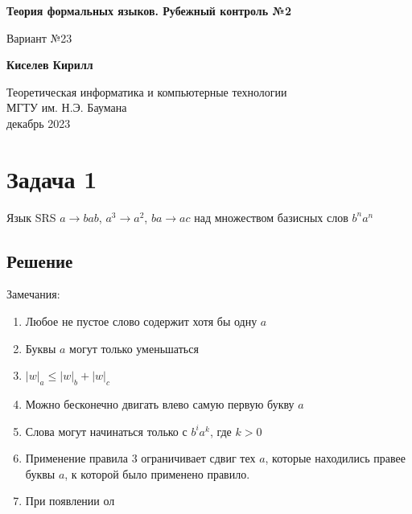 \documentclass[a4paper, 14pt]{article}
\begin{document}
\begin{titlepage}
    \begin{center}
        \vspace*{1cm}
            
        \Huge
        \textbf{Теория формальных языков. Рубежный контроль №2}
		
        \vspace{0.5cm}
        \LARGE
        Вариант №23
            
        \vspace{1.5cm}
            
        \textbf{Киселев Кирилл}
            
        \vfill
            
        \vspace{0.8cm}
		
        \Large
        Теоретическая информатика и компьютерные технологии\\
        МГТУ им. Н.Э. Баумана\\
        декабрь 2023
            
    \end{center}
\end{titlepage}

\newpage

\tableofcontents 

\newpage

\section{Задача 1}

Язык SRS $a \rightarrow bab$, $a^3 \rightarrow a^2$, $ba \rightarrow ac$ над множеством базисных слов $b^n a^n$

\subsection{Решение}


Замечания:

\begin{enumerate}
  \item Любое не пустое слово содержит хотя бы одну $a$
  \item Буквы $a$ могут только уменьшаться
  \item $|w|_a \leq |w|_b + |w|_c$
  \item Можно бесконечно двигать влево самую первую букву $a$
  \item Слова могут начинаться только с $b^i a^k$, где $k > 0$
  \item Применение правила 3 ограничивает сдвиг тех $a$, которые находились правее буквы $a$, к которой было применено правило.
  \item При появлении ол
  


    
\end{enumerate}
\end{document}
